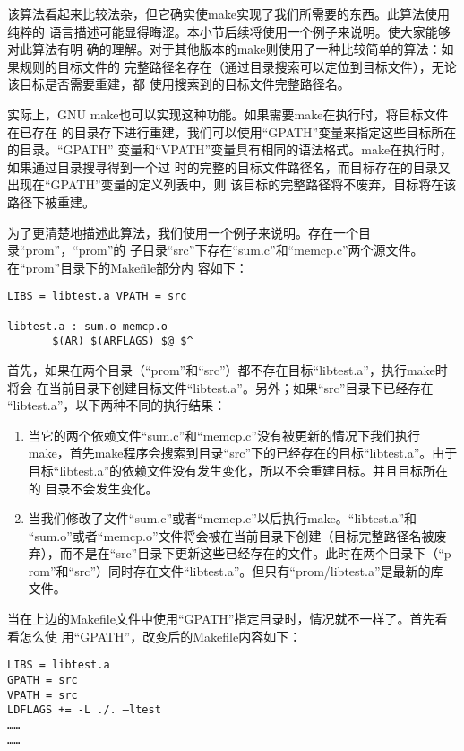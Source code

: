 该算法看起来比较法杂，但它确实使make实现了我们所需要的东西。此算法使用纯粹的
语言描述可能显得晦涩。本小节后续将使用一个例子来说明。使大家能够对此算法有明
确的理解。对于其他版本的make则使用了一种比较简单的算法：如果规则的目标文件的
完整路径名存在（通过目录搜索可以定位到目标文件），无论该目标是否需要重建，都
使用搜索到的目标文件完整路径名。

实际上，GNU make也可以实现这种功能。如果需要make在执行时，将目标文件在已存在
的目录存下进行重建，我们可以使用“GPATH”变量来指定这些目标所在的目录。“GPATH”
变量和“VPATH”变量具有相同的语法格式。make在执行时，如果通过目录搜寻得到一个过
时的完整的目标文件路径名，而目标存在的目录又出现在“GPATH”变量的定义列表中，则
该目标的完整路径将不废弃，目标将在该路径下被重建。

为了更清楚地描述此算法，我们使用一个例子来说明。存在一个目录“prom”，“prom”的
子目录“src”下存在“sum.c”和“memcp.c”两个源文件。在“prom”目录下的Makefile部分内
容如下：

\begin{Verbatim}[]
LIBS = libtest.a VPATH = src

libtest.a : sum.o memcp.o
       $(AR) $(ARFLAGS) $@ $^
\end{Verbatim}

首先，如果在两个目录（“prom”和“src”）都不存在目标“libtest.a”，执行make时将会
在当前目录下创建目标文件“libtest.a”。另外；如果“src”目录下已经存在
“libtest.a”，以下两种不同的执行结果：

\begin{enumerate}
\itemsep=0pt \parskip=0pt
\item      当它的两个依赖文件“sum.c”和“memcp.c”没有被更新的情况下我们执行
    make，首先make程序会搜索到目录“src”下的已经存在的目标“libtest.a”。由于
    目标“libtest.a”的依赖文件没有发生变化，所以不会重建目标。并且目标所在的
    目录不会发生变化。

\item  当我们修改了文件“sum.c”或者“memcp.c”以后执行make。“libtest.a”和
    “sum.o”或者“memcp.o”文件将会被在当前目录下创建（目标完整路径名被废
    弃），而不是在“src”目录下更新这些已经存在的文件。此时在两个目录下（“p
    rom”和“src”）同时存在文件“libtest.a”。但只有“prom/libtest.a”是最新的库
    文件。
\end{enumerate}

当在上边的Makefile文件中使用“GPATH”指定目录时，情况就不一样了。首先看看怎么使
用“GPATH”，改变后的Makefile内容如下：

\begin{Verbatim}[]
LIBS = libtest.a
GPATH = src
VPATH = src
LDFLAGS += -L ./. –ltest
……
……
\end{Verbatim}

